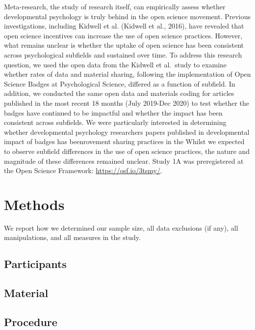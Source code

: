 \documentclass[
  english,
  man]{apa6}
\begin{document}
Meta-research, the study of research itself, can empirically assess whether developmental psychology is truly behind in the open science movement. Previous investigations, including Kidwell et al. (Kidwell et al., 2016), have revealed that open science incentives can increase the use of open science practices. However, what remains unclear is whether the uptake of open science has been consistent across psychological subfields and sustained over time. To address this research question, we used the open data from the Kidwell et al.~study to examine whether rates of data and material sharing, following the implementation of Open Science Badges at Psychological Science, differed as a function of subfield. In addition, we conducted the same open data and materials coding for articles published in the most recent 18 months (July 2019-Dec 2020) to test whether the badges have continued to be impactful and whether the impact has been consistent across subfields. We were particularly interested in determining whether developmental psychology researchers papers published in developmental impact of badges has beenrovement sharing practices in the Whilst we expected to observe subfield differences in the use of open science practices, the nature and magnitude of these differences remained unclear. Study 1A was preregistered at the Open Science Framework: \url{https://osf.io/3tsmy/}.

\hypertarget{methods}{%
\section{Methods}\label{methods}}

We report how we determined our sample size, all data exclusions (if any), all manipulations, and all measures in the study.

\hypertarget{participants}{%
\subsection{Participants}\label{participants}}

\hypertarget{material}{%
\subsection{Material}\label{material}}

\hypertarget{procedure}{%
\subsection{Procedure}\label{procedure}}
\end{document}
